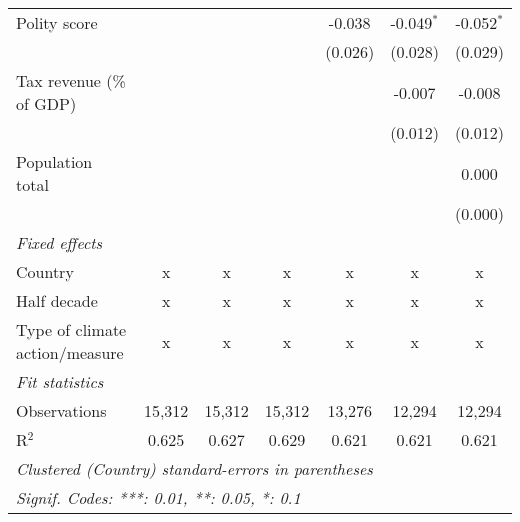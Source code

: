 \begin{tabular}{lcccccc}
   Polity score                                                  &         &              &               & -0.038        & -0.049$^{*}$  & -0.052$^{*}$\\   
                                                                 &         &              &               & (0.026)       & (0.028)       & (0.029)\\   
   Tax revenue (\% of GDP)                                       &         &              &               &               & -0.007        & -0.008\\   
                                                                 &         &              &               &               & (0.012)       & (0.012)\\   
   Population total                                              &         &              &               &               &               & 0.000\\   
                                                                 &         &              &               &               &               & (0.000)\\   
   \emph{Fixed effects}\\
   Country                                                       & x       & x            & x             & x             & x             & x\\  
   Half decade                                                   & x       & x            & x             & x             & x             & x\\  
   Type of climate action/measure                                & x       & x            & x             & x             & x             & x\\  
   \midrule \emph{Fit statistics}\\
   Observations                                                  & 15,312  & 15,312       & 15,312        & 13,276        & 12,294        & 12,294\\  
   R$^2$                                                         & 0.625   & 0.627        & 0.629         & 0.621         & 0.621         & 0.621\\  
   \midrule
   \multicolumn{7}{l}{\emph{Clustered (Country) standard-errors in parentheses}}\\
   \multicolumn{7}{l}{\emph{Signif. Codes: ***: 0.01, **: 0.05, *: 0.1}}\\
\end{tabular}
\par\endgroup


